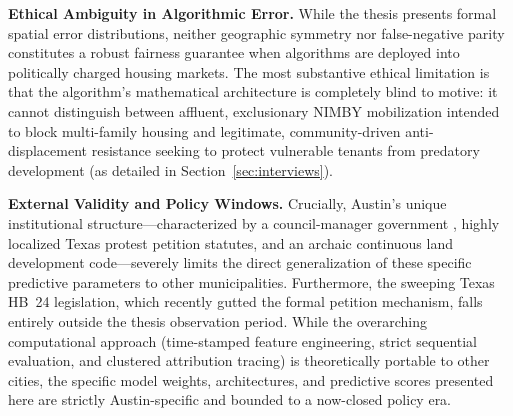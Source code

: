 \documentclass[11pt, letterpaper, oneside]{article}
\begin{document}
\textbf{Ethical Ambiguity in Algorithmic Error.} While the thesis presents formal spatial error distributions, neither geographic symmetry nor false-negative parity constitutes a robust fairness guarantee when algorithms are deployed into politically charged housing markets. The most substantive ethical limitation is that the algorithm's mathematical architecture is completely blind to motive: it cannot distinguish between affluent, exclusionary NIMBY mobilization intended to block multi-family housing and legitimate, community-driven anti-displacement resistance seeking to protect vulnerable tenants from predatory development (as detailed in Section~\ref{sec:interviews}).  

\textbf{External Validity and Policy Windows.} Crucially, Austin's unique institutional structure—characterized by a council-manager government \cite{cityaustin2010}, highly localized Texas protest petition statutes, and an archaic continuous land development code—severely limits the direct generalization of these specific predictive parameters to other municipalities. Furthermore, the sweeping Texas HB~24 legislation, which recently gutted the formal petition mechanism, falls entirely outside the thesis observation period. While the overarching computational approach (time-stamped feature engineering, strict sequential evaluation, and clustered attribution tracing) is theoretically portable to other cities, the specific model weights, architectures, and predictive scores presented here are strictly Austin-specific and bounded to a now-closed policy era.
\end{document}

